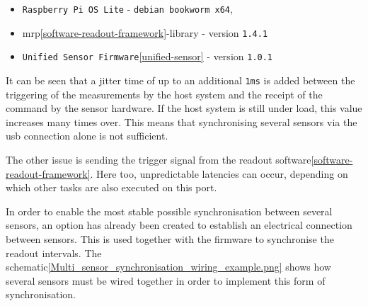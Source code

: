 \begin{itemize}
\tightlist
\item
  \passthrough{\lstinline!Raspberry Pi OS Lite!} -
  \passthrough{\lstinline!debian bookworm x64!},
\item
  \gls{mrp}\ref{software-readout-framework}-library - version
  \passthrough{\lstinline!1.4.1!}
\item
  \passthrough{\lstinline!Unified Sensor Firmware!}\ref{unified-sensor}
  - version \passthrough{\lstinline!1.0.1!}
\end{itemize}

It can be seen that a jitter time of up to an additional
\passthrough{\lstinline!1ms!} is added between the triggering of the
measurements by the host system and the receipt of the command by the
sensor hardware. If the host system is still under load, this value
increases many times over. This means that synchronising several sensors
via the \gls{usb} connection alone is not sufficient.

The other issue is sending the trigger signal from the readout
software\ref{software-readout-framework}. Here too, unpredictable
latencies can occur, depending on which other tasks are also executed on
this port.

In order to enable the most stable possible synchronisation between
several sensors, an option has already been created to establish an
electrical connection between sensors. This is used together with the
firmware to synchronise the readout intervals. The
schematic\ref{Multi_sensor_synchronisation_wiring_example.png} shows how
several sensors must be wired together in order to implement this form
of synchronisation.

